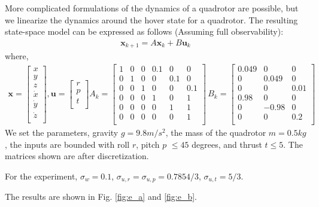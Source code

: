 \documentclass{article}[12pt]
\begin{document}
More complicated formulations of the dynamics of a quadrotor are possible, but we linearize the dynamics around the hover state for a quadrotor.
The resulting state-space model can be expressed as follows (Assuming full observability):
\begin{align*}
\mathbf{x}_{k+1} = A\mathbf{x}_{k} +B\mathbf{u}_{k}
\end{align*}
where,
\begin{align*}
\mathbf{x} = 
\begin{bmatrix}
x \\
y \\
z \\
\dot{x}\\
\dot{y}\\
\dot{z}\\
\end{bmatrix},
\mathbf{u} = 
\begin{bmatrix}
r \\
p \\
t \\
\end{bmatrix}
A_k = 
\begin{bmatrix}
1 & 0 & 0 & 0.1 &0 &0\\
0 & 1 & 0 & 0 &0.1 &0\\
0 & 0 & 1 & 0 &0 &0.1\\
0 & 0 & 0 & 1 &0 &1\\ 
0 & 0 & 0 & 0 &1 &1\\ 
0 & 0 & 0 & 0 &0 &1\\  
\end{bmatrix}
\,
B_k = 
\begin{bmatrix}
0.049 & 0 & 0 \\
0 & 0.049 & 0 \\
0 & 0 & 0.01 \\
0.98 & 0 & 0 \\
0 & -0.98 & 0 \\
0 & 0 & 0.2 \\
\end{bmatrix}
\end{align*}
We set the parameters, gravity $g = 9.8 m/s^2$, the mass of the quadrotor $m = 0.5 kg$, the inputs are bounded with roll $r$, pitch $p$ $\leq 45$ degrees, and thrust $t \leq 5$.  
The matrices shown are after discretization. 

For the experiment, $\sigma_w = 0.1$, $\sigma_{u,r} = \sigma_{u,p} = 0.7854/3$, $\sigma_{u,t} = 5/3$.

The results are shown in Fig. \ref{fig:e_a} and \ref{fig:e_b}.
\end{document}
